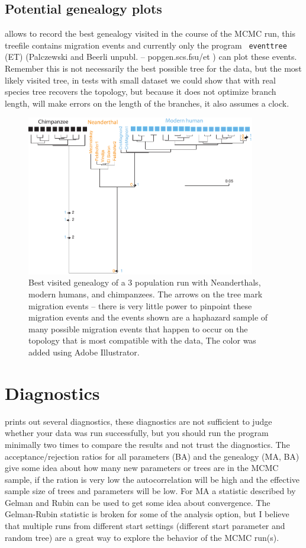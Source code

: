 \section{Potential genealogy plots}
\migrate allows to record the best genealogy visited in the course of the MCMC run, this treefile contains migration events and currently only the program \texttt{ eventtree} (ET) (Palczewski and Beerli unpubl. -- popgen.scs.fsu/et ) can plot these events. Remember this is not necessarily the best possible tree for the data, but the most likely visited tree, in tests with small dataset we could show that with real species tree \migrate recovers the topology, but because it does not optimize branch length, will make errors on the length of the branches, it also assumes a clock.
\begin{figure}[bh]
\centering \includegraphics[width=10cm]{mim/human_tree}
\caption{Best visited genealogy of a 3 population run with Neanderthals, modern humans, and chimpanzees. The arrows on the tree mark migration events --  there is very little power to pinpoint these migration events and the events shown are a haphazard sample of many possible migration events that happen to occur on the topology that is most compatible with the data, The color was added using Adobe Illustrator.\label{MIGTREE}}
\end{figure}

\newpage
\chapter{Diagnostics}
\migrate prints out several diagnostics, these diagnostics are not sufficient to judge whether your data was run successfully, but you should run the program minimally two times to compare the results and not trust the diagnostics. The acceptance/rejection ratios for all parameters (BA) and the genealogy (MA, BA) give some idea about how many new parameters or trees are in the MCMC sample, if the ration is very low the autocorrelation will be high and the effective sample size of trees and parameters will be low. For MA a statistic described by Gelman and Rubin \cite{kass:1998:mcm} can be used to get some idea about convergence. The Gelman-Rubin statistic is broken for some of the analysis option, but I believe that multiple runs from different start settings (different start parameter and random tree) are a great way to explore the behavior of the MCMC run(s).

